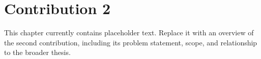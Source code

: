 \chapter{Contribution 2}
\label{ch::Contribution2}

This chapter currently contains placeholder text. Replace it with an overview of the second contribution, including its problem statement, scope, and relationship to the broader thesis.
